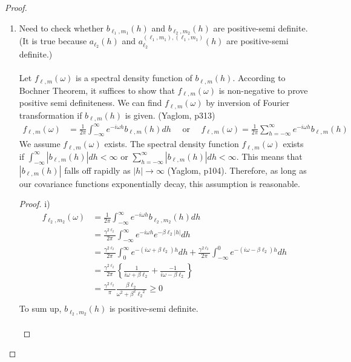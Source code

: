\documentclass[11pt]{article}
\begin{document}
\begin{itemize}
\begin{proof}
\begin{enumerate}
\item
Need to check whether $b_{\ell_1,m_1}(h)$ and $b_{\ell_2,m_2}(h)$ are positive-semi definite.\\ 
(It is true because $a_{\ell_2}(h)$ and $a_{\ell_2}^{(\ell_1,m_1),(\ell_1,m_1)}(h)$ are positive-semi definite.)\\
\\
Let $f_{\ell,m}(\omega)$ is a spectral density function of $b_{\ell,m}(h)$. According to Bochner Theorem, it suffices to show that $f_{\ell,m}(\omega)$ is non-negative to prove positive semi definiteness. We can find $f_{\ell,m}(\omega)$ by inversion of Fourier transformation if $b_{\ell,m}(h)$ is given. (Yaglom, p313)\\
\begin{align*}
f_{\ell,m}(\omega) &=  \frac{1}{2\pi} \int_{-\infty}^\infty e^{-i\omega h} b_{\ell,m}(h) dh \quad \text{ or } \quad f_{\ell,m}(\omega) =  \frac{1}{2\pi} \sum_{h=-\infty}^\infty e^{-i\omega h} b_{\ell,m}(h) 
\end{align*}
We assume  $f_{\ell,m}(\omega)$ exists. The spectral density function $f_{\ell,m}(\omega)$ exists if $\int_{-\infty}^\infty |b_{\ell,m}(h)|dh < \infty$ or $\sum_{h=-\infty}^\infty |b_{\ell,m}(h)|dh < \infty$. This means that $|b_{\ell,m}(h)|$ falls off rapidly as $|h| \rightarrow \infty$ (Yaglom, p104). Therefore, as long as our covariance functions exponentially decay, this assumption is reasonable.\\
\begin{proof}
i)\\
\begin{align*}
f_{\ell_2,m_2}(\omega) &= \frac{1}{2\pi} \int_{-\infty}^\infty e^{-i\omega h} b_{\ell_2,m_2}(h) dh\\
&= \frac{\gamma^{2\ell_2}}{2\pi} \int_{-\infty}^\infty e^{-i\omega h} e^{-\beta \ell_2 |h|} dh\\
&= \frac{\gamma^{2\ell_2}}{2\pi} \int_{0}^\infty e^{-(i \omega + \beta \ell_2) h} dh + \frac{\gamma^{2\ell_2}}{2\pi} \int_{-\infty}^0 e^{-(i \omega - \beta \ell_2) h} dh\\
&= \frac{\gamma^{2\ell_2}}{2\pi} \left\{ \frac{1}{i \omega + \beta \ell_2} + \frac{-1}{i \omega - \beta \ell_2} \right\}\\
&= \frac{\gamma^{2\ell_2}}{\pi} \frac{\beta \ell_2}{\omega^2 + \beta^2 {\ell_2}^2} \ge 0\\
\end{align*}
To sum up, $b_{\ell_2,m_2}(h)$ is positive-semi definite.\\
\\

\end{proof}
\end{enumerate}
\end{proof}
\end{itemize}
\end{document}
